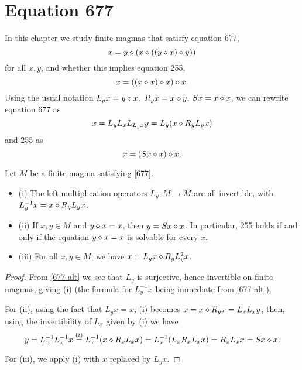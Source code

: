 \chapter{Equation 677}\label{677-chapter}

In this chapter we study finite magmas that satisfy equation 677,
\begin{equation}\label{677}
  x = y \diamond (x \diamond ((y \diamond x) \diamond y))
\end{equation}
for all $x,y$, and whether this implies equation 255,
\begin{equation}\label{255}
  x = ((x \diamond x) \diamond x) \diamond x.
\end{equation}
Using the usual notation $L_y x = y \diamond x$, $R_y x = x \diamond y$, $Sx = x \diamond x$, we can rewrite equation 677 as
\begin{equation}\label{677-alt}
  x = L_y L_x L_{L_y x} y = L_y (x \diamond R_y L_y x)
\end{equation}
and 255 as
$$ x = (Sx \diamond x) \diamond x.$$

\begin{lemma}\label{677-basic} Let $M$ be a finite magma satisfying \eqref{677}.
  \begin{itemize}
  \item (i)  The left multiplication operators $L_y: M \to M$ are all invertible, with $L_y^{-1} x = x \diamond R_y L_y x$.
  \item (ii) If $x,y \in M$ and $y \diamond x = x$, then $y = Sx \diamond x$.  In particular, 255 holds if and only if the equation $y \diamond x = x$ is solvable for every $x$.
  \item (iii)  For all $x,y \in M$, we have $x = L_y x \diamond R_y L_y^2 x$.
\end{itemize}
\end{lemma}

\begin{proof}  From \eqref{677-alt} we see that $L_y$ is surjective, hence invertible on finite magmas, giving (i) (the formula for $L_y^{-1} x$ being immediate from \eqref{677-alt}).

  For (ii), using the fact that $L_y x = x$, (i) becomes $x = x \diamond R_y x = L_x L_x y$, then, using the invertibility of $L_x$ given by (i) we have
  \[y = L_x^{-1} L_x^{-1} x \stackrel{(i)}{=} L_x^{-1} (x \diamond R_x L_x x) = L_x^{-1} (L_x R_x L_x x) =
  R_x L_x x = Sx \diamond x.\]

  For (iii), we apply (i) with $x$ replaced by $L_y x$.
\end{proof}

